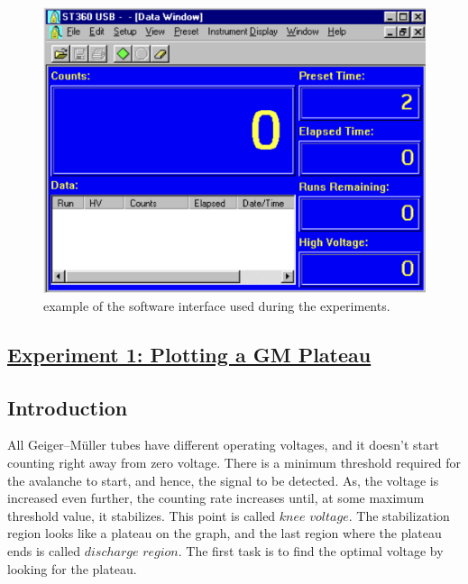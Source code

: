 \documentclass[twocolumn]{article}
\begin{document}
\begin{center}
\begin{figure}[t!]
\includegraphics[scale=0.45]{screen.png}
\caption{example of the software interface used during the experiments.}
\end{figure}
\end{center}




\begin{center}\section*{\underline{Experiment 1: Plotting a GM Plateau}}\end{center}
\subsection*{Introduction}
All Geiger–Müller tubes have different operating voltages, and it doesn't start counting right away from zero voltage. There is a minimum threshold required for the avalanche to start, and hence, the signal to be detected. As, the voltage is increased even further, the counting rate increases until, at some maximum threshold value, it stabilizes. This point is called $knee$ $voltage$. The stabilization region looks like a plateau on the graph, and the last region where the plateau ends is called $discharge$ $region$. The first task is to find the optimal voltage by looking for the plateau. 
\end{document}
